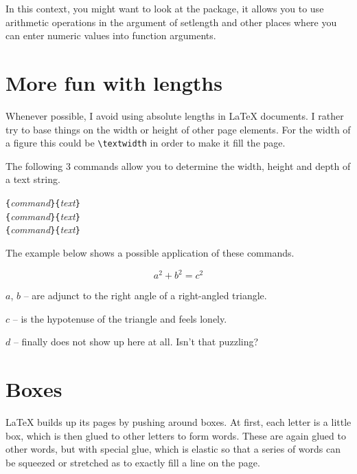 In this context, you might want to look at the  package,
it allows you to use arithmetic operations in the argument of setlength
and other places where you can enter numeric values into function
arguments.

\section{More fun with lengths}

Whenever possible, I avoid using absolute lengths in
\LaTeX{} documents. I rather try to base things on the width or height
of other page elements. For the width of a figure this could
be \verb|\textwidth| in order to make it fill the page.

The following 3 commands allow you to determine the width, height and
depth of a text string.

\begin{command}
\verb|{|\emph{command}\verb|}{|\emph{text}\verb|}|\\
\verb|{|\emph{command}\verb|}{|\emph{text}\verb|}|\\
\verb|{|\emph{command}\verb|}{|\emph{text}\verb|}|
\end{command}

\noindent The example below shows a possible application of these commands.

\begin{example}
\flushleft
\newenvironment{vardesc}[1]{%
  \settowidth{\parindent}{#1:\ }
  \makebox[0pt][r]{#1:\ }}{}

\begin{displaymath}
a^2+b^2=c^2
\end{displaymath}

\begin{vardesc}{Where}$a$, 
$b$ -- are adjunct to the right 
angle of a right-angled triangle.  

$c$ -- is the hypotenuse of 
the triangle and feels lonely.

$d$ -- finally does not show up 
here at all. Isn't that puzzling?
\end{vardesc}
\end{example}

\section{Boxes}
\LaTeX{} builds up its pages by pushing around boxes. At first, each
letter is a little box, which is then glued to other letters to form
words. These are again glued to other words, but with special glue,
which is elastic so that a series of words can be squeezed or
stretched as to exactly fill a line on the page. 

